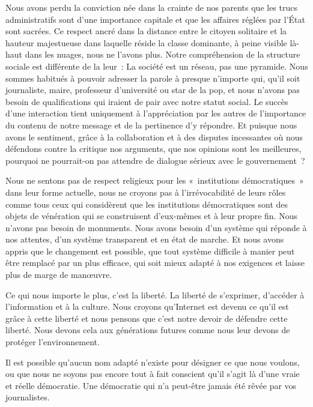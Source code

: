 Nous avons perdu la conviction née dans la crainte de nos parents que les trucs administratifs sont d’une importance capitale et que les affaires réglées par l’État sont sacrées. Ce respect ancré dans
la distance entre le citoyen solitaire et la hauteur majestueuse dans laquelle réside la classe dominante, à peine visible là-haut dans les nuages, nous ne l’avons plus. Notre compréhension de la
structure sociale est différente de la leur~: La société est un réseau, pas une pyramide. Nous sommes habitués à pouvoir adresser la parole à presque n’importe qui, qu’il soit journaliste, maire,
professeur d’université ou star de la pop, et nous n’avons pas besoin de qualifications qui iraient de pair avec notre statut social. Le succès d’une interaction tient uniquement à l’appréciation par
les autres de l’importance du contenu de notre message et de la pertinence d’y répondre. Et puisque nous avons le sentiment, grâce à la collaboration et à des disputes incessantes où nous défendons
contre la critique nos arguments, que nos opinions sont les meilleures, pourquoi ne pourrait-on pas attendre de dialogue sérieux avec le gouvernement~?

Nous ne sentons pas de respect religieux pour les «~institutions démocratiques~» dans leur forme actuelle, nous ne croyons pas à l’irrévocabilité de leurs rôles comme tous ceux qui considèrent que les
institutions démocratiques sont des objets de vénération qui se construisent d'eux-mêmes et à leur propre fin. Nous n’avons pas besoin de monuments. Nous avons besoin d’un système qui réponde
à nos
attentes, d’un système transparent et en état de marche. Et nous avons appris que le changement est possible, que tout système difficile à manier peut être remplacé par un plus efficace, qui soit
mieux adapté à nos exigences et laisse plus de marge de manœuvre.

Ce qui nous importe le plus, c’est la liberté. La liberté de s’exprimer, d’accéder à l’information et à la culture. Nous croyons qu’Internet est devenu ce qu’il est grâce à cette liberté et nous
pensons que c’est notre devoir de défendre cette liberté. Nous devons cela aux générations futures comme nous leur devons de protéger l’environnement.

Il est possible qu’aucun nom adapté n’existe pour désigner ce que nous voulons, ou que nous ne soyons pas encore tout à fait conscient qu'il s'agit là d'une vraie et réelle démocratie. Une
démocratie qui n’a peut-être jamais
été rêvée par vos journalistes.
